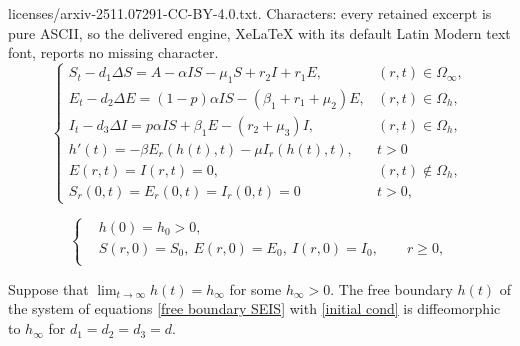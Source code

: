 \documentclass[10pt,a4paper]{amsart}
\begin{document}
licenses/arxiv-2511.07291-CC-BY-4.0.txt. Characters: every retained excerpt is pure ASCII, so the delivered engine, XeLaTeX with its default Latin Modern text font, reports no missing character.
 	\begin{equation} \label{free boundary SEIS}
 	\begin{cases}
			S_t-d_1\Delta S=A-\alpha IS-\mu_1 S+r_2 I+r_1E, &(r,t)\in\Omega_\infty,\\
			E_t-d_2\Delta E=(1-p)\alpha IS-(\beta_1 +r_1+\mu_2) E, &(r,t) \in \Omega_h,\\
			I_t-d_3\Delta I=p\alpha IS+\beta_1 E-(r_2+\mu_3) I, &(r,t) \in \Omega_h,\\
			h'(t)=-\beta E_r(h(t),t)-\mu I_r(h(t),t), &t>0\\
			E(r,t)=I(r,t)=0, &(r,t)\notin \Omega_h,\\
			S_r(0,t)=E_r(0,t)=I_r(0,t)=0 &t>0,
	\end{cases}
	\end{equation}

	\begin{equation} \label{initial cond}
		\left \{ \begin{aligned}
			&h(0)=h_0>0, \\
			&S(r,0)=S_0,\ E(r,0)=E_0,\ I(r,0)=I_0, \qquad r\geq0, \\
		\end{aligned} \right.
	\end{equation}

\begin{lemma} \label{straightening lem2}
	Suppose that $\displaystyle \lim _{t \to \infty}h(t)=h_\infty$ for some $h_\infty >0$. The free boundary $h(t)$ of the system of equations \cref{free boundary SEIS} with \cref{initial cond} is diffeomorphic to $h_\infty$ for $d_1=d_2=d_3=d$.
\end{lemma}
\end{document}
